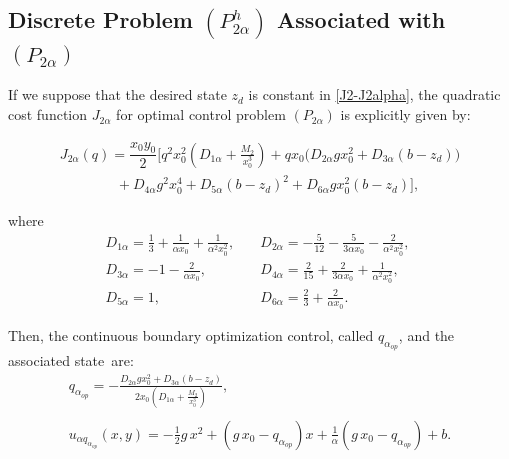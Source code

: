 \documentclass[11pt]{article}
\begin{document}
 \subsection{Discrete Problem  ${(P^h_{2\alpha})}$ Associated with $(P_{2\alpha})$} %
     
    If we suppose that the desired state $z_d$ is  constant in \eqref{J2-J2alpha}, the quadratic cost function  $J_{2\alpha}$ for optimal control problem $(P_{2\alpha})$ is explicitly given by:
 
      \begin{equation}\label{J2alpha-Explicito}
      \begin{array}{ll}
  J_{2\alpha}(q)=\dfrac{x_0 y_0}{2}\Big[ q^2 x_0^2 (D_{1\alpha} +\tfrac{M_2}{x_0^3})+q x_0 \Big(D_{2\alpha} g x_0^2+D_{3\alpha}  (b-z_d) \Big)\\[0.45cm]
   \qquad \qquad +D_{4\alpha} g^2 x_0^4 +D_{5\alpha}  (b-z_d)^2+D_{6\alpha} g x_0^2 (b-z_d) \Big],
  \end{array}
  \end{equation}
  
 \noindent where
\begin{equation}  
  \begin{array}{lll}
  D_{1\alpha}= \tfrac{1}{3}+\tfrac{1}{\alpha x_0}+\tfrac{1}{\alpha^2 x_0^2} ,  \quad & D_{2\alpha}= -\tfrac{5}{12}-\tfrac{5}{3\alpha x_0}-\tfrac{2}{\alpha^2 x_0^2}, \;\\
   D_{3\alpha}=- 1-\tfrac{2}{\alpha x_0},& D_{4\alpha}=\tfrac{2}{15} +\tfrac{2}{3\alpha x_0}+\tfrac{1}{\alpha^2 x_0^2} ,\\
    D_{5\alpha}=1,   & D_{6\alpha}=\tfrac{2}{3}+\tfrac{2}{\alpha x_0} .
  \end{array}
  \end{equation}
 
  
 \noindent Then, the continuous boundary optimization control, called $q_{\alpha_{op}}$,  and the associated state~are: 
\begin{equation} \label{qalphaop}
\begin{array}{ll}
q_{\alpha_{op}}=-\tfrac{D_{2\alpha} g x_0^2+D_{3\alpha} (b-z_d)}{2 x_0 \left(D_{1\alpha}+\tfrac{M_2}{x_0^3}\right)},\\ \\
 u_{\alpha q_{\alpha_{op}}}(x,y) = -\tfrac{1}{2} g\, x^2 + (g\, x_0 - q_{\alpha_{op}}) x + \tfrac{1}{\alpha} (g\,x_0 - q_{\alpha_{op}}) +b .
 \end{array}
 \end{equation} 
 
\end{document}
